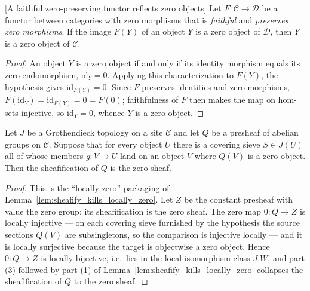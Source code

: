 \begin{lemma}

[A faithful zero-preserving functor reflects zero objects]
  \label{lem:isZero_of_faithful_preservesZeroMorphisms}
  Let \(F : \mathcal{C} \to \mathcal{D}\) be a functor between categories with zero
  morphisms that is \emph{faithful} and \emph{preserves zero morphisms}. If the image
  \(F(Y)\) of an object \(Y\) is a zero object of \(\mathcal{D}\), then \(Y\) is a zero
  object of \(\mathcal{C}\).
\end{lemma}
\begin{proof}

  An object \(Y\) is a zero object if and only if its identity morphism equals its zero
  endomorphism, \(\mathrm{id}_Y = 0\). Applying this characterization to \(F(Y)\), the
  hypothesis gives \(\mathrm{id}_{F(Y)} = 0\). Since \(F\) preserves identities and zero
  morphisms, \(F(\mathrm{id}_Y) = \mathrm{id}_{F(Y)} = 0 = F(0)\); faithfulness of \(F\)
  then makes the map on hom-sets injective, so \(\mathrm{id}_Y = 0\), whence \(Y\) is a
  zero object.
\end{proof}

\begin{lemma}

  \label{lem:isZero_presheafToSheaf_of_locally_isZero}
  Let \(J\) be a Grothendieck topology on a site \(\mathcal{C}\) and let \(Q\) be a
  presheaf of abelian groups on \(\mathcal{C}\). Suppose that for every object \(U\) there
  is a covering sieve \(S \in J(U)\) all of whose members \(g : V \to U\) land on an object
  \(V\) where \(Q(V)\) is a zero object. Then the sheafification of \(Q\) is the zero
  sheaf.
\end{lemma}
\begin{proof}
  \leanok
  This is the ``locally zero'' packaging of
  Lemma~\ref{lem:sheafify_kills_locally_zero}. Let \(Z\) be the constant presheaf with
  value the zero group; its sheafification is the zero sheaf. The zero map \(0 : Q \to Z\)
  is locally injective --- on each covering sieve furnished by the hypothesis the source
  sections \(Q(V)\) are subsingletons, so the comparison is injective locally --- and it
  is locally surjective because the target is objectwise a zero object. Hence
  \(0 : Q \to Z\) is locally bijective, i.e.\ lies in the local-isomorphism class
  \(J.W\), and part (3) followed by part (1) of
  Lemma~\ref{lem:sheafify_kills_locally_zero} collapses the sheafification of \(Q\) to the
  zero sheaf.
\end{proof}

